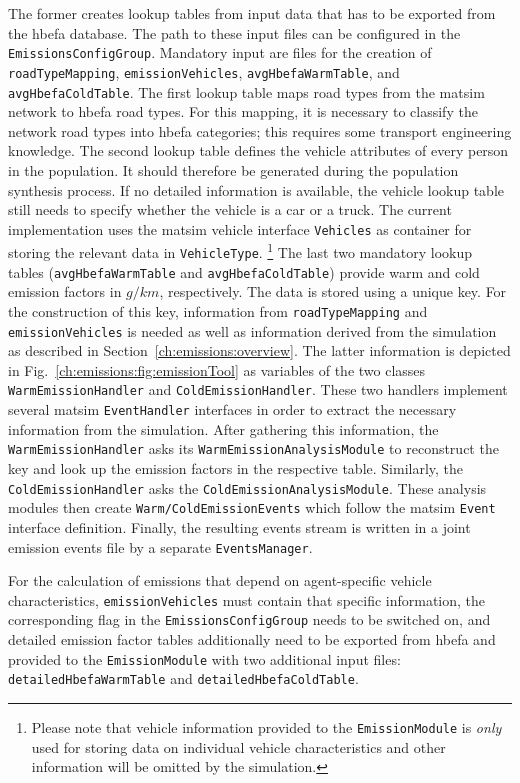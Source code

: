 The former creates lookup tables from input data that has to be exported from the \gls{hbefa} database. The path to these input files can be configured in the \texttt{EmissionsConfigGroup}. Mandatory input are files for the creation of \texttt{roadTypeMapping}, \texttt{emissionVehicles}, \texttt{avgHbefaWarmTable}, and \texttt{avgHbefa\-Cold\-Table}.
%
The first lookup table maps road types from the \gls{matsim} network to \gls{hbefa} road types. For this mapping, it is necessary to classify the network road types into \gls{hbefa} categories; this requires some transport engineering knowledge.
%
The second lookup table defines the vehicle attributes of every person in the population. It should therefore be generated during the population synthesis process. If no detailed information is available, the vehicle lookup table still needs to specify whether the vehicle is a car or a truck. The current implementation uses the \gls{matsim} vehicle interface 
\texttt{Vehicles} as container for storing the relevant data in \texttt{VehicleType}.%
%
\footnote{
%
Please note that vehicle information provided to the \texttt{EmissionModule} is \emph{only} used for storing data on individual vehicle characteristics and other information will be omitted by the simulation.
%
}
%
The last two mandatory lookup tables (\texttt{avgHbefaWarmTable} and \texttt{avgHbefaColdTable}) provide warm and cold emission factors in $g/km$, respectively. The data is stored using a unique key. For the construction of this key, information from \texttt{roadTypeMapping} and \texttt{emissionVehicles} is needed as well as information derived from the simulation as described in Section~\ref{ch:emissions:overview}.
%
The latter information is depicted in Fig.~\ref{ch:emissions:fig:emissionTool} as variables of the two classes \texttt{WarmEmissionHandler} and \texttt{ColdEmissionHandler}. These two handlers implement several \gls{matsim} \texttt{EventHandler} interfaces in order to extract the necessary information from the simulation. After gathering this information, the \texttt{WarmEmissionHandler} asks its \texttt{WarmEmissionAnalysisModule} to reconstruct the key and look up the emission factors in the respective table. Similarly, the \texttt{ColdEmissionHandler} asks the \texttt{ColdEmissionAnalysisModule}. These analysis modules then create \texttt{Warm/ColdEmissionEvents} which follow the \gls{matsim} \texttt{Event} interface definition. Finally, the resulting events stream is written in a 
joint emission events file by a separate \texttt{EventsManager}.

For the calculation of emissions that depend on agent-specific vehicle characteristics, \texttt{emissionVehicles} must contain that specific information, the corresponding flag in the \texttt{EmissionsConfigGroup} needs to be switched on, and detailed emission factor tables additionally need to be exported from \gls{hbefa} and provided to the \texttt{EmissionModule} with two additional input files: \texttt{detailed\-HbefaWarmTable} and \texttt{detailedHbefaColdTable}.


